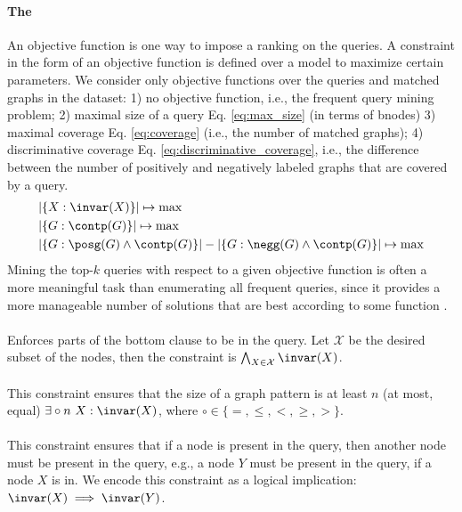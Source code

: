 \paragraph{The \ObjectiveFunction} An objective function is one way to impose a ranking on the queries. A constraint in the form of an objective function is defined over a model to maximize certain parameters. We consider only objective functions over the queries and matched graphs in the dataset: 1) no objective function, i.e., the frequent query mining problem; 2) maximal size of a query Eq. \ref{eq:max_size} (in terms of bnodes) 3) maximal coverage Eq. \ref{eq:coverage} (i.e., the number of matched graphs); 4) discriminative coverage Eq. \ref{eq:discriminative_coverage}, i.e., the difference between the number of positively and negatively labeled graphs that are covered by a query.
 \begin{align}
 &| \{ X: \invar(X) \}| \mapsto \max \label{eq:max_size} \\
 &| \{ G: \contp(G) \}| \mapsto \max \label{eq:coverage} \\
 &|\{ G : \posg(G) \wedge \contp(G)\}| - |\{ G: \negg(G) \wedge \contp(G) \}| \mapsto \max \label{eq:discriminative_coverage}
 \end{align}
Mining the top-$k$ queries with respect to a given objective function is often a more meaningful task than enumerating all frequent queries, since it provides a more manageable number of solutions that are best according to some function \cite{mdl_mining}.

\paragraph{\TopologicalConstraint}
Enforces parts of the bottom clause to be in the query. Let $\mathcal{X}$ be the desired subset of the nodes, then the constraint is $\bigwedge_{X \in \mathcal{X}}\invar(X)$.

\paragraph{\CardinalityConstraint}
This constraint ensures that the size of a graph pattern is at least $n$ (at most, equal) $\exists \circ n~X: \invar(X)$, where $\circ \in \{ =, \leq, <, \geq, > \}$.

\paragraph{\ifthenconstraint} 
This constraint ensures that if a node is present in the query, then another node must be present in the query, e.g., a node $Y$ must be present in the query, if a node $X$ is in. We encode this constraint as a logical implication: $\invar(X) \implies \invar(Y)$.

